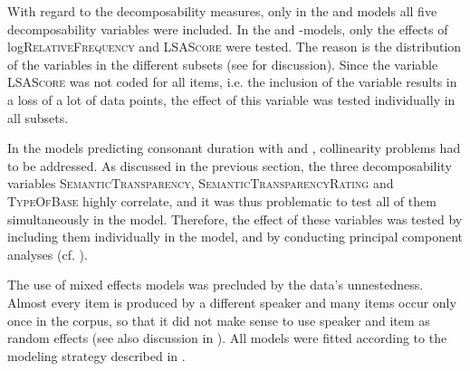 With regard to the decomposability measures, only in the  and models all five decomposability variables were included. In the  and -models, only the effects of log\textsc{RelativeFrequency} and \textsc{LSAScore} were tested. The reason is the distribution of the variables in the different subsets (see  for discussion). 
Since the variable \textsc{LSAScore} was not coded for all items, i.e. the inclusion of the variable results in a loss of a lot of data points, the effect of this variable was tested individually in all subsets. 

In the models predicting consonant duration with  and , collinearity problems had to be addressed. As discussed in the previous section, the three decomposability variables \textsc{SemanticTransparency}, \textsc{SemanticTransparencyRating} and \textsc{TypeOfBase} highly correlate, and it was thus problematic to test all of them simultaneously in the model. Therefore, the effect of these variables was tested by including them individually in the model, and by conducting principal component analyses (cf. ). 


The use of mixed effects models was precluded by the data's unnestedness. Almost every item is produced by a different speaker and many items occur only once in the corpus, so that it did not make sense to use speaker and item as random effects (see also discussion in ). All models were fitted according to the modeling strategy described in .



